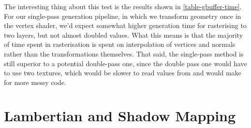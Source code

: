 The interesting thing about this test is the results shown in \ref{table-gbuffer-time}. For our single-pass generation pipeline, in which we transform geometry once in the vertex shader, we'd expect somewhat higher generation time for rasterising to two layers, but not almost doubled values. What this means is that the majority of time spent in rasterisation is spent on interpolation of vertices and normals rather than the transformations themselves. That said, the single-pass method is still superior to a potential double-pass one, since the double pass one would have to use two textures, which would be slower to read values from and would make for more messy code.

\section{Lambertian and Shadow Mapping}

